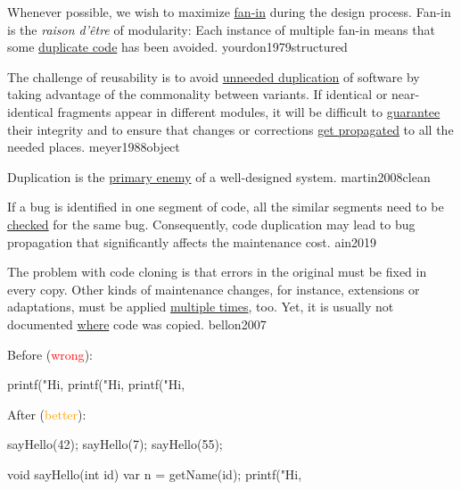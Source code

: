 \documentclass{article}
\begin{document}


  {Whenever possible, we wish to maximize \ul{fan-in} during the design process. Fan-in is the \textit{raison d'\^{e}tre} of modularity: Each instance of multiple fan-in means that some \ul{duplicate code} has been avoided.}
  {yourdon1979structured}

  {The challenge of reusability is to avoid \ul{unneeded duplication} of software by taking advantage of the commonality between variants. If identical or near-identical fragments appear in different modules, it will be difficult to \ul{guarantee} their integrity and to ensure that changes or corrections \ul{get propagated} to all the needed places.}
  {meyer1988object}

  {Duplication is the \ul{primary enemy} of a well-designed system.}
  {martin2008clean}

  {If a bug is identified in one segment of code, all the similar segments need to be \ul{checked} for the same bug. Consequently, code duplication may lead to bug propagation that significantly affects the maintenance cost.}
  {ain2019}

  {The problem with code cloning is that errors in the original must be fixed in every copy. Other kinds of maintenance changes, for instance, extensions or adaptations, must be applied \ul{multiple times}, too. Yet, it is usually not documented \ul{where} code was copied.}
  {bellon2007}

\begin{multicols}{2}
Before (\textcolor{red}{wrong}):\par
{\small\begin{ffcode}
printf("Hi, %
printf("Hi, %
printf("Hi, %
\end{ffcode}
}
\par\columnbreak\par
After (\textcolor{orange}{better}):\par
{\small\begin{ffcode}
sayHello(42);
sayHello(7);
sayHello(55);

void sayHello(int id) {
  var n = getName(id);
  printf("Hi, %
}
\end{ffcode}
}
\end{multicols}
\plush{}
\end{document}

